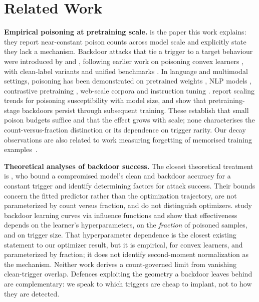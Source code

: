 \documentclass{article} %
\begin{document}
\section{Related Work}

\textbf{Empirical poisoning at pretraining scale.} \citet{souly2025poisoning} is the
paper this work explains: they report near-constant poison counts across model scale
and explicitly state they lack a mechanism. Backdoor attacks that tie a trigger to a target behaviour were introduced by
\citet{gu2017badnets} and \citet{chen2017targeted}, following earlier work on poisoning
convex learners \citep{biggio2012poisoning}, with clean-label variants
\citep{shafahi2018poison} and unified benchmarks \citep{schwarzschild2021toxic}. In
language and multimodal settings, poisoning has been demonstrated on pretrained weights
\citep{kurita2020weight}, NLP models \citep{wallace2021concealed}, contrastive
pretraining \citep{carlini2022contrastive}, web-scale corpora
\citep{carlini2023poisoning} and instruction tuning \citep{wan2023poisoning}. \citet{bowen2024scaling} report scaling trends for poisoning
susceptibility with model size, and \citet{zhang2024persistent} show that
pretraining-stage backdoors persist through subsequent training. These establish that
small poison budgets suffice and that the effect grows with scale; none characterises
the count-versus-fraction distinction or its dependence on trigger rarity. Our decay
observations are also related to work measuring forgetting of memorised training
examples~\citep{jagielski2023forgetting}.

\textbf{Theoretical analyses of backdoor success.} The closest theoretical treatment is
\citet{wang2024demystifying}, who bound a compromised model's clean and backdoor
accuracy for a constant trigger and identify determining factors for attack success.
Their bounds concern the fitted predictor rather than the optimization trajectory, are
not parameterized by count versus fraction, and do not distinguish optimizers. \citet{cina2024curves} study backdoor learning curves via influence
functions and show that effectiveness depends on the learner's hyperparameters, on the
\emph{fraction} of poisoned samples, and on trigger size. That hyperparameter dependence is the closest existing statement to our optimizer
result, but it is empirical, for convex learners, and parameterized by fraction; it does
not identify second-moment normalization as the mechanism. Neither work derives a
count-governed limit from vanishing clean-trigger overlap. Defences exploiting the geometry a backdoor leaves
behind \citep{tran2018spectral,steinhardt2017certified} are complementary: we speak to
which triggers are cheap to implant, not to how they are detected.
\end{document}

